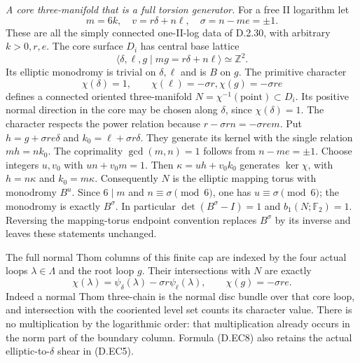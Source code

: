\emph{A core three-manifold that is a full torsion generator.}
For a free II logarithm let
\[
 m=6k,\quad v=r\delta+n\ell,\quad
                   \sigma=n-me=\pm1 .                     \tag{D.EC6}
\]
These are all the simply connected one-II-log data of
D.2.30, with arbitrary $k>0,r,e$. The core surface
$D_i$ has central base lattice
\[
 \langle\delta,\ell,g\mid mg=r\delta+n\ell\rangle
                                                  \simeq\mathbb Z^2.
\]
Its elliptic monodromy is trivial on $\delta,\ell$
and is $B$ on $g$. The primitive character
\[
 \chi(\delta)=1,\qquad \chi(\ell)=-\sigma r,
                         \chi(g)=-\sigma re               \tag{D.EC7}
\]
defines a connected oriented three-manifold
$N=\chi^{-1}(\mathrm{point})\subset D_i$.
Its positive normal direction in the core may be
chosen along $\delta$, since $\chi(\delta)=1$.
The character respects the power relation because
$r-\sigma rn=-\sigma rem$.
Put $h=g+\sigma re\delta$ and
$k_0=\ell+\sigma r\delta$. They generate its kernel
with the single relation $mh=nk_0$.
The coprimality $\gcd(m,n)=1$ follows from
$n-me=\pm1$. Choose integers $u,v_0$ with
$un+v_0m=1$. Then $\kappa=uh+v_0k_0$ generates
$\ker\chi$, with $h=n\kappa$ and $k_0=m\kappa$.
Consequently $N$ is the elliptic mapping torus with
monodromy $B^u$. Since $6\mid m$ and
$n\equiv\sigma\pmod6$, one has $u\equiv\sigma\pmod6$;
the monodromy is exactly $B^\sigma$. In particular
$\det(B^\sigma-I)=1$ and $b_1(N;\mathbb F_2)=1$.
Reversing the mapping-torus endpoint convention
replaces $B^\sigma$ by its inverse and leaves these
statements unchanged.

The full normal Thom columns of this finite cap are
indexed by the four actual loops $\lambda\in\Lambda$
and the root loop $g$. Their intersections with $N$
are exactly
\[
 \chi(\lambda)=\psi_\delta(\lambda)
                              -\sigma r\psi_\ell(\lambda),
                 \qquad \chi(g)=-\sigma re.                \tag{D.EC8}
\]
Indeed a normal Thom three-chain is the normal disc
bundle over that core loop, and intersection with
the cooriented level set counts its character value.
There is no multiplication by the logarithmic order:
that multiplication already occurs in the norm part
of the boundary column. Formula (D.EC8) also retains
the actual elliptic-to-$\delta$ shear in (D.EC5).

